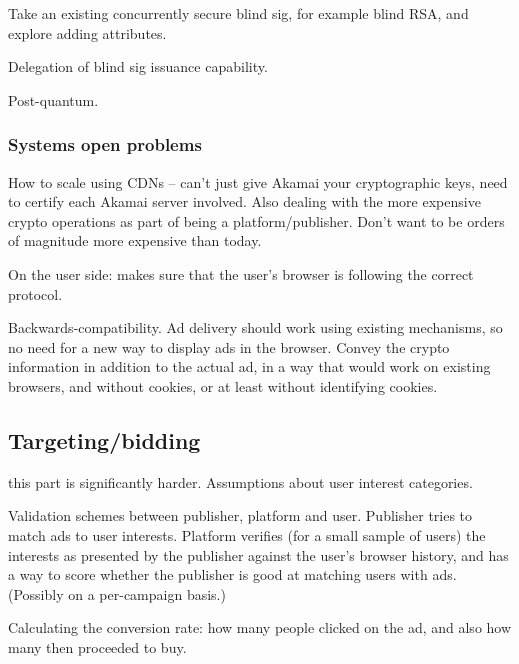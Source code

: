 Take an existing concurrently secure blind sig, for example blind RSA, and explore adding attributes.

Delegation of blind sig issuance capability.

Post-quantum.

\subsubsection{Systems open problems}
How to scale using CDNs -- can't just give Akamai your cryptographic keys, need to certify each Akamai server involved. Also dealing with the more expensive crypto operations as part of being a platform/publisher.  Don't want to be orders of magnitude more expensive than today.

On the user side: makes sure that the user's browser is following the correct protocol.

Backwards-compatibility.  Ad delivery should work using existing mechanisms, so no need for a new way to display ads in the browser.
Convey the crypto information in addition to the actual ad, in a way that would work on existing browsers, and without cookies, or at least without identifying cookies.



\subsection{Targeting/bidding}
\label{r:matching}

this part is significantly harder.  Assumptions about user interest categories.

Validation schemes between publisher, platform and user.  Publisher tries to match ads to user interests.  Platform verifies (for a small sample of users) the interests as presented by the publisher against the user's browser history, and has a way to score whether the publisher is good at matching users with ads.  (Possibly on a per-campaign basis.)

Calculating the conversion rate: how many people clicked on the ad, and also how many then proceeded to buy.
